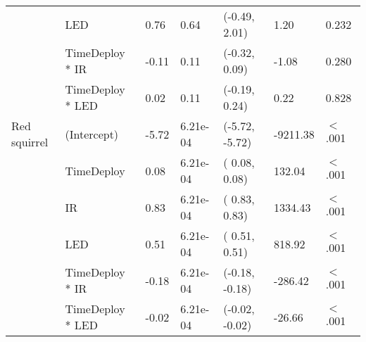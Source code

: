 \begin{table}[ht]
\begin{tabular}{lllllll}
   & LED & 0.76 & 0.64 & (-0.49,  2.01) & 1.20 & 0.232  \\ 
   & TimeDeploy * IR & -0.11 & 0.11 & (-0.32,  0.09) & -1.08 & 0.280  \\ 
   & TimeDeploy * LED & 0.02 & 0.11 & (-0.19,  0.24) & 0.22 & 0.828  \\ 
  Red squirrel & (Intercept) & -5.72 & 6.21e-04 & (-5.72, -5.72) & -9211.38 & $<$ .001 \\ 
   & TimeDeploy & 0.08 & 6.21e-04 & ( 0.08,  0.08) & 132.04 & $<$ .001 \\ 
   & IR & 0.83 & 6.21e-04 & ( 0.83,  0.83) & 1334.43 & $<$ .001 \\ 
   & LED & 0.51 & 6.21e-04 & ( 0.51,  0.51) & 818.92 & $<$ .001 \\ 
   & TimeDeploy * IR & -0.18 & 6.21e-04 & (-0.18, -0.18) & -286.42 & $<$ .001 \\ 
   & TimeDeploy * LED & -0.02 & 6.21e-04 & (-0.02, -0.02) & -26.66 & $<$ .001 \\ 
   \hline
\end{tabular}
\end{table}
